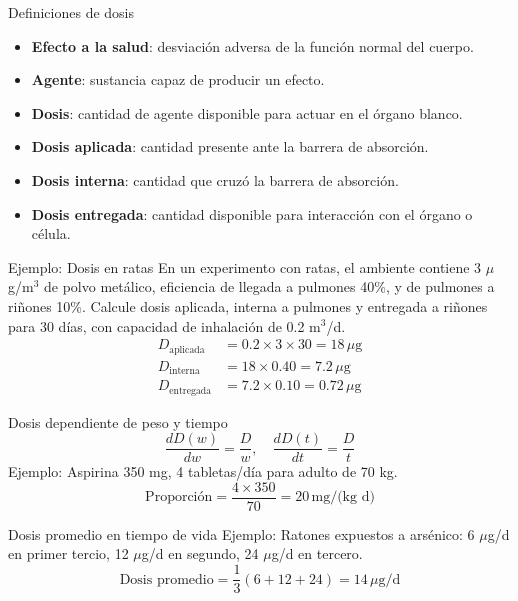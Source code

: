 \documentclass[10pt,compress]{beamer}
\begin{document}
\begin{frame}{Definiciones de dosis}
\begin{itemize}
\item \textbf{Efecto a la salud}: desviación adversa de la función normal del cuerpo.
\item \textbf{Agente}: sustancia capaz de producir un efecto.
\item \textbf{Dosis}: cantidad de agente disponible para actuar en el órgano blanco.
\item \textbf{Dosis aplicada}: cantidad presente ante la barrera de absorción.
\item \textbf{Dosis interna}: cantidad que cruzó la barrera de absorción.
\item \textbf{Dosis entregada}: cantidad disponible para interacción con el órgano o célula.
\end{itemize}
\end{frame}

\begin{frame}{Ejemplo: Dosis en ratas}
En un experimento con ratas, el ambiente contiene 3 $\mu$g/m$^3$ de polvo metálico, eficiencia de llegada a pulmones 40\%, y de pulmones a riñones 10\%. Calcule dosis aplicada, interna a pulmones y entregada a riñones para 30 días, con capacidad de inhalación de 0.2 m$^3$/d.
\begin{align*}
D_{\text{aplicada}} &= 0.2 \times 3 \times 30 = 18 \, \mu\text{g} \\
D_{\text{interna}} &= 18 \times 0.40 = 7.2 \, \mu\text{g} \\
D_{\text{entregada}} &= 7.2 \times 0.10 = 0.72 \, \mu\text{g}
\end{align*}
\end{frame}

\begin{frame}{Dosis dependiente de peso y tiempo}
\[
\frac{dD(w)}{dw} = \frac{D}{w}, \quad \frac{dD(t)}{dt} = \frac{D}{t}
\]
Ejemplo: Aspirina 350 mg, 4 tabletas/día para adulto de 70 kg.
\[
\text{Proporción} = \frac{4 \times 350}{70} = 20 \, \text{mg/(kg d)}
\]
\end{frame}

\begin{frame}{Dosis promedio en tiempo de vida}
Ejemplo: Ratones expuestos a arsénico: 6 $\mu$g/d en primer tercio, 12 $\mu$g/d en segundo, 24 $\mu$g/d en tercero.
\[
\text{Dosis promedio} = \frac{1}{3}(6+12+24) = 14 \, \mu\text{g/d}
\]
\end{frame}
\end{document}
